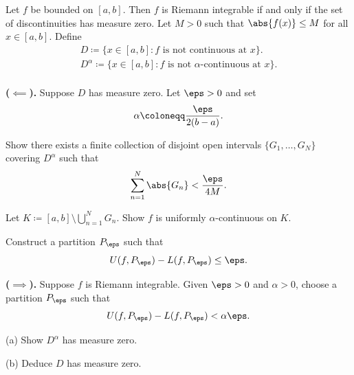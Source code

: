 \begin{theorem}{
	Let $f$ be bounded on $[a,b]$.
	Then $f$ is Riemann integrable if and only if the set of discontinuities has measure zero.
}
	Let $M>0$ such that $\abs{f(x)}\leq M$ for all $x\in[a,b]$.
	Define
	\begin{gather*}
	    D \coloneqq \{x\in[a,b] : \text{$f$ is not continuous at $x$}\}.\\
	    D^\alpha \coloneqq \{x\in[a,b] : \text{$f$ is not $\alpha$-continuous at $x$}\}.\\
	\end{gather*}

	\textbf{($\impliedby$).}
	Suppose $D$ has measure zero.
	Let $\eps > 0$ and set
	\[
		\alpha \coloneqq \frac{\eps}{2(b-a)}.
	\]
	\begin{problem}
		Show there exists a finite collection of disjoint open intervals $\{G_1,\ldots,G_N\}$ covering $D^\alpha$ such that
		\[
			\sum_{n=1}^N \abs{G_n} < \frac{\eps}{4M}.
		\]
	\end{problem}
	\begin{problem}
		Let $K \coloneqq [a,b]\setminus \bigcup_{n=1}^N G_n$.
		Show $f$ is uniformly $\alpha$-continuous on $K$.
	\end{problem}

	\begin{problem}
		Construct a partition $P_\eps$ such that
		\[
			U(f,P_\eps)-L(f,P_\eps)\leq \eps.
		\]
	\end{problem}

	\textbf{($\implies$).}
	Suppose $f$ is Riemann integrable.
	Given $\eps > 0$ and $\alpha > 0$, choose a partition $P_\eps$ such that
	\[
		U(f,P_\eps)-L(f,P_\eps) < \alpha\eps.
	\]

	\begin{problem}
		(a) Show $D^\alpha$ has measure zero.

		(b) Deduce $D$ has measure zero.
	\end{problem}
\end{theorem}